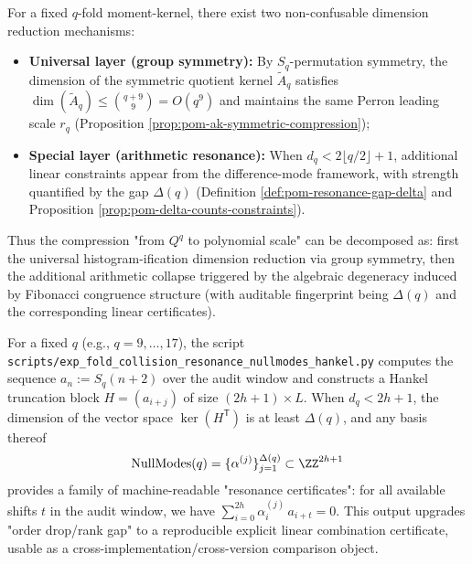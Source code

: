 \begin{remark}\label{rem:pom-two-layer-dim-reduction}
For a fixed \(q\)-fold moment-kernel, there exist two non-confusable dimension reduction mechanisms:
\begin{itemize}
  \item \textbf{Universal layer (group symmetry):} By \(S_q\)-permutation symmetry, the dimension of the symmetric quotient kernel \(\widetilde A_q\) satisfies
  \(
  \dim(\widetilde A_q)\le \binom{q+9}{9}=O(q^9)
  \)
  and maintains the same Perron leading scale \(r_q\) (Proposition \ref{prop:pom-ak-symmetric-compression});
  \item \textbf{Special layer (arithmetic resonance):} When \(d_q<2\lfloor q/2\rfloor+1\), additional linear constraints appear from the difference-mode framework, with strength quantified by the gap \(\Delta(q)\) (Definition \ref{def:pom-resonance-gap-delta} and Proposition \ref{prop:pom-delta-counts-constraints}).
\end{itemize}
Thus the compression "from \(Q^q\) to polynomial scale" can be decomposed as: first the universal histogram-ification dimension reduction via group symmetry, then the additional arithmetic collapse triggered by the algebraic degeneracy induced by Fibonacci congruence structure (with auditable fingerprint being \(\Delta(q)\) and the corresponding linear certificates).
\end{remark}

\begin{remark}\label{rem:pom-nullmodes-algorithm}
For a fixed \(q\) (e.g., \(q=9,\dots,17\)), the script \texttt{scripts/exp\_fold\_collision\_resonance\_nullmodes\_hankel.py} computes the sequence \(a_n:=S_q(n+2)\) over the audit window and constructs a Hankel truncation block \(H=(a_{i+j})\) of size \((2h+1)\times L\).
When \(d_q<2h+1\), the dimension of the vector space \(\ker(H^{\mathsf T})\) is at least \(\Delta(q)\), and any basis thereof
\[
\mathrm{NullModes}(q)=\{\alpha^{(j)}\}_{j=1}^{\Delta(q)}\subset\ZZ^{2h+1}
\]
provides a family of machine-readable "resonance certificates": for all available shifts \(t\) in the audit window, we have
\(
\sum_{i=0}^{2h}\alpha^{(j)}_i\,a_{i+t}=0
\).
This output upgrades "order drop/rank gap" to a reproducible explicit linear combination certificate, usable as a cross-implementation/cross-version comparison object.
\end{remark}

